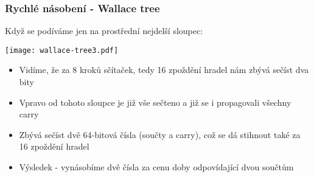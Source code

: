 \documentclass{beamer}
\begin{document}
\begin{frame}[shrink=5]
\frametitle{Rychlé násobení - Wallace tree}

Když se podíváme jen na prostřední nejdelší sloupec:
\begin{center}
\texttt{[image: wallace-tree3.pdf]}
\end{center}

\begin{itemize}
\item Vidíme, že za 8 kroků sčítaček, tedy 16 zpoždění hradel nám zbývá sečíst dva bity
\item Vpravo od tohoto sloupce je již vše sečteno a již se i propagovali všechny carry
\item Zbývá sečíst dvě 64-bitová čísla (součty a carry), což se dá stihnout také za 16 zpoždění hradel
\item Výsledek - vynásobíme dvě čísla za cenu doby odpovídající dvou součtům
\end{itemize}

\end{frame}
\end{document}
